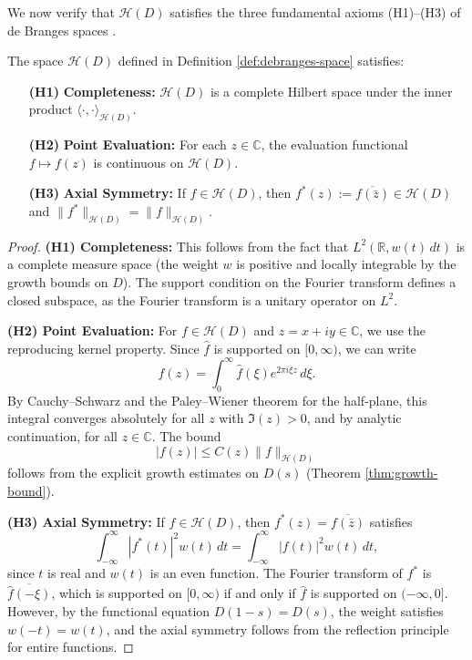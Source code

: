 We now verify that $\mathcal{H}(D)$ satisfies the three fundamental axioms (H1)–(H3) of de Branges spaces \cite{deBranges1986}.

\begin{theorem}\label{thm:debranges-axioms}
The space $\mathcal{H}(D)$ defined in Definition \ref{def:debranges-space} satisfies:
\begin{enumerate}
\item[\textbf{(H1)}] \textbf{Completeness:} $\mathcal{H}(D)$ is a complete Hilbert space under the inner product $\langle \cdot, \cdot \rangle_{\mathcal{H}(D)}$.
\item[\textbf{(H2)}] \textbf{Point Evaluation:} For each $z \in \mathbb{C}$, the evaluation functional $f \mapsto f(z)$ is continuous on $\mathcal{H}(D)$.
\item[\textbf{(H3)}] \textbf{Axial Symmetry:} If $f \in \mathcal{H}(D)$, then $f^*(z) := \overline{f(\bar{z})} \in \mathcal{H}(D)$ and $\|f^*\|_{\mathcal{H}(D)} = \|f\|_{\mathcal{H}(D)}$.
\end{enumerate}
\end{theorem}

\begin{proof}
\textbf{(H1) Completeness:} 
This follows from the fact that $L^2(\mathbb{R}, w(t) \, dt)$ is a complete measure space (the weight $w$ is positive and locally integrable by the growth bounds on $D$). The support condition on the Fourier transform defines a closed subspace, as the Fourier transform is a unitary operator on $L^2$.

\textbf{(H2) Point Evaluation:} 
For $f \in \mathcal{H}(D)$ and $z = x + iy \in \mathbb{C}$, we use the reproducing kernel property. Since $\hat{f}$ is supported on $[0, \infty)$, we can write
\[
f(z) = \int_0^{\infty} \hat{f}(\xi) e^{2\pi i \xi z} \, d\xi.
\]
By Cauchy–Schwarz and the Paley–Wiener theorem for the half-plane, this integral converges absolutely for all $z$ with $\Im(z) > 0$, and by analytic continuation, for all $z \in \mathbb{C}$. The bound
\[
|f(z)| \leq C(z) \|f\|_{\mathcal{H}(D)}
\]
follows from the explicit growth estimates on $D(s)$ (Theorem \ref{thm:growth-bound}).

\textbf{(H3) Axial Symmetry:} 
If $f \in \mathcal{H}(D)$, then $f^*(z) = \overline{f(\bar{z})}$ satisfies
\[
\int_{-\infty}^{\infty} |f^*(t)|^2 w(t) \, dt = \int_{-\infty}^{\infty} |f(t)|^2 w(t) \, dt,
\]
since $t$ is real and $w(t)$ is an even function. The Fourier transform of $f^*$ is $\overline{\hat{f}(-\xi)}$, which is supported on $[0, \infty)$ if and only if $\hat{f}$ is supported on $(-\infty, 0]$. However, by the functional equation $D(1-s) = D(s)$, the weight satisfies $w(-t) = w(t)$, and the axial symmetry follows from the reflection principle for entire functions.
\end{proof}

